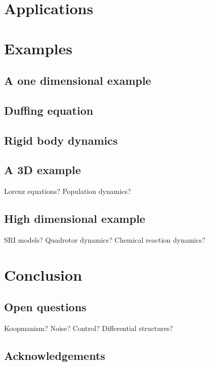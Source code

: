 \documentclass[12pt]{amsart}
\begin{document}
\section{Applications}

\section{Examples}

\subsection{A one dimensional example}

\subsection{Duffing equation}

\subsection{Rigid body dynamics}

\subsection{A 3D example}
Lorenz equations?  Population dynamics?

\subsection{High dimensional example}
SRI models?  Quadrotor dynamics?  Chemical reaction dynamics?

\section{Conclusion}

\subsection{Open questions}
Koopmanism?  Noise?  Control?  Differential structures?

\subsection{Acknowledgements}



\end{document}
